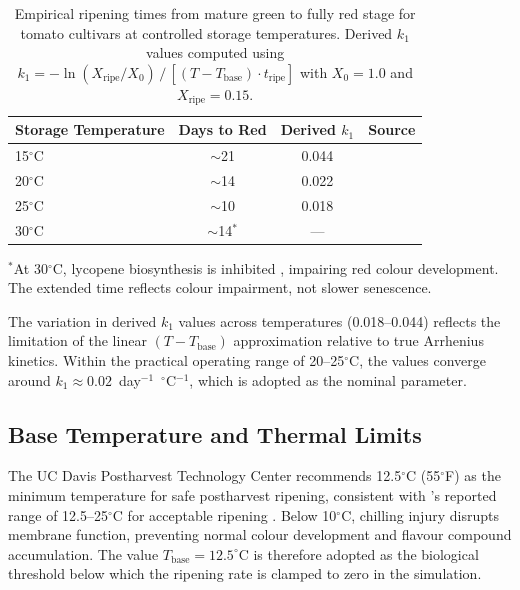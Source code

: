     \begin{table}[ht]
        \caption{Empirical ripening times from mature green to fully red stage for tomato cultivars at controlled storage temperatures. Derived $k_1$ values computed using $k_1 = -\ln(X_{\text{ripe}}/X_0) \,/\, [(T - T_{\text{base}}) \cdot t_{\text{ripe}}]$ with $X_0 = 1.0$ and $X_{\text{ripe}} = 0.15$.}
        \label{tab:ripening_times}
        \centering
        \begin{tabular}{lccc}
            \hline
            \textbf{Storage Temperature} & \textbf{Days to Red} & \textbf{Derived $k_1$} & \textbf{Source} \\
            \hline
            15$^{\circ}$C & $\sim$21 & 0.044 & \citet{ogundiwin2022metachronous} \\
            20$^{\circ}$C & $\sim$14 & 0.022 & \citet{ogundiwin2022metachronous} \\
            25$^{\circ}$C & $\sim$10 & 0.018 & \citet{ogundiwin2022metachronous} \\
            30$^{\circ}$C & $\sim$14$^{*}$ & --- & \citet{ogundiwin2022metachronous} \\
            \hline
        \end{tabular}

        \vspace{4pt}
        \raggedright\footnotesize{$^{*}$At 30$^{\circ}$C, lycopene biosynthesis is inhibited \citep{saltveit2005}, impairing red colour development. The extended time reflects colour impairment, not slower senescence.}
    \end{table}

    The variation in derived $k_1$ values across temperatures (0.018--0.044) reflects the limitation of the linear $(T - T_{\text{base}})$ approximation relative to true Arrhenius kinetics. Within the practical operating range of 20--25$^{\circ}$C, the values converge around $k_1 \approx 0.02$~day$^{-1}$~$^{\circ}$C$^{-1}$, which is adopted as the nominal parameter.

    \subsection{Base Temperature and Thermal Limits}

    The UC Davis Postharvest Technology Center \citep{ucdavis_tomato} recommends 12.5$^{\circ}$C (55$^{\circ}$F) as the minimum temperature for safe postharvest ripening, consistent with \citeauthor{saltveit2005}'s reported range of 12.5--25$^{\circ}$C for acceptable ripening \citep{saltveit2005}. Below 10$^{\circ}$C, chilling injury disrupts membrane function, preventing normal colour development and flavour compound accumulation. The value $T_{\text{base}} = 12.5^{\circ}$C is therefore adopted as the biological threshold below which the ripening rate is clamped to zero in the simulation.


